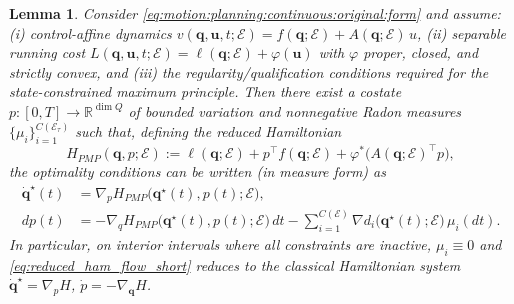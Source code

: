 \documentclass{article} %
\let\vec=\boldsymbol
\newtheorem{lemma}[theorem]{Lemma}         %
\begin{document}
\begin{lemma}
\label{thm:fwd_pmp_to_reduced_ham:short}
Consider \cref{eq:motion:planning:continuous:original:form} and assume:
(i) control-affine dynamics $v(\vec q,\vec u,t;\mathcal E)=f(\vec q;\mathcal E)+A(\vec q;\mathcal E)\,u$,
(ii) separable running cost $L(\vec q,\vec u,t;\mathcal E)=\ell(\vec q;\mathcal E)+\varphi(\vec u)$ with $\varphi$ proper, closed, and strictly convex,
and (iii) the regularity/qualification conditions required for the state-constrained maximum principle.
Then there exist a costate $p:[0,T]\to\mathbb R^{\dim Q}$ of bounded variation and nonnegative Radon measures
$\{\mu_i\}_{i=1}^{C(\mathcal E_\tau)}$ such that, defining the reduced Hamiltonian
\begin{equation}
\label{eq:reduced_ham_short}
H_{PMP}(\vec{q},p;\mathcal E):=\ell(\vec{q};\mathcal E)+p^\top f(\vec{q};\mathcal E)+\varphi^\ast\!\big(A(\vec{q};\mathcal E)^\top p\big),
\end{equation}
the optimality conditions can be written (in measure form) as
\begin{equation}
\label{eq:reduced_ham_flow_short}
\begin{aligned}
\dot{\vec{q}}^{\star}(t)&=\nabla_p H_{PMP}\big(\vec{q}^{\star}(t),p(t);\mathcal E\big),\\
dp(t)&= -\nabla_q H_{PMP}\big(\vec{q}^{\star}(t),p(t);\mathcal E\big)\,dt
-\sum_{i=1}^{C(\mathcal E)} \nabla d_i\!\big(\vec{q}^\star(t);\mathcal E\big)\,\mu_i(dt).    
\end{aligned}
\end{equation}
In particular, on interior intervals where all constraints are inactive, $\mu_i\equiv 0$ and \cref{eq:reduced_ham_flow_short}
reduces to the classical Hamiltonian system $\dot{\vec{q}}^\star=\nabla_p H$, $\dot p=-\nabla_{\vec{q}} H$.
\end{lemma}
\end{document}

